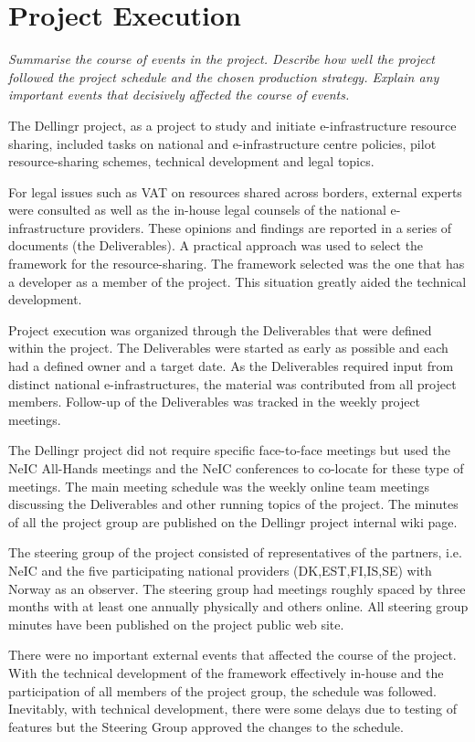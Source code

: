 \documentclass{article}
\newcommand{\dell}{Dellingr\xspace}
\begin{document}
\section{Project Execution}
{\it Summarise the course of events in the project. Describe how well the project followed the project schedule and the chosen production strategy. Explain any important events that decisively affected the course of events.}

The \dell project, as a project to study and initiate e-infrastructure resource sharing, included tasks on national and e-infrastructure centre policies, pilot resource-sharing schemes, technical development and legal topics.

For legal issues such as VAT on resources shared across borders, external experts were consulted as well as the in-house legal
counsels of the national e-infrastructure providers.
These opinions and findings are reported in a series of documents (the Deliverables).
A practical approach was used to select the framework for the resource-sharing.
The framework selected was the one that has a developer as a member of the project.
This situation greatly aided the technical development.

Project execution was organized through the Deliverables that were defined within the project.
The Deliverables were started as early as possible and each had a defined owner and a target date.
As the Deliverables required input from distinct national e-infrastructures, the material was contributed from all project members.
Follow-up of the Deliverables was tracked in the weekly project meetings.

The \dell project did not require specific face-to-face meetings but used the NeIC All-Hands meetings and the NeIC conferences
to co-locate for these type of meetings.
The main meeting schedule was the weekly online team meetings discussing the Deliverables and other running topics of the project.
The minutes of all the project group are published on the \dell project internal wiki page.

The steering group of the project consisted of representatives of the partners, i.e. NeIC and the five participating national providers
(DK,EST,FI,IS,SE) with Norway as an observer.
The steering group had meetings roughly spaced by three months with at least one annually physically and others online.
All steering group minutes have been published on the project public web site.

There were no important external events that affected the course of the project.
With the technical development of the framework effectively in-house and the participation
of all members of the project group, the schedule was followed.
Inevitably, with technical development, there were some delays due to testing of features but
the Steering Group approved the changes to the schedule.
\end{document}

